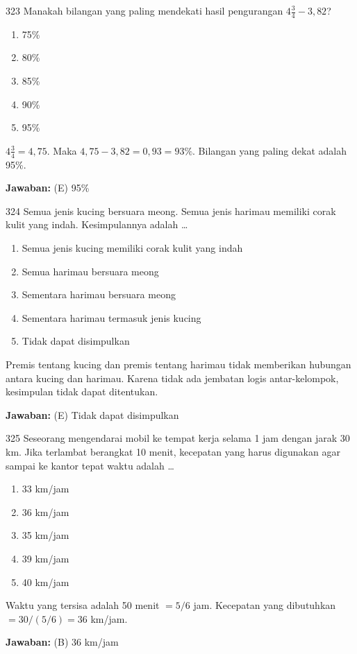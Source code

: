 \documentclass[11pt]{article}
\newenvironment{pil}{\begin{enumerate}[label=(\Alph*),leftmargin=*,itemsep=1pt,topsep=3pt]}{\end{enumerate}}
\newcommand{\jw}[1]{\par\smallskip\begin{jawbox}\textbf{Jawaban:} #1\end{jawbox}}
\begin{document}
\begin{soalbox}{3}{23}
Manakah bilangan yang paling mendekati hasil pengurangan $4\frac{3}{4}-3{,}82$?
\begin{pil}\item 75\% \item 80\% \item 85\% \item 90\% \item 95\%\end{pil}
\end{soalbox}
\begin{pembox}
$4\frac{3}{4}=4{,}75$. Maka $4{,}75-3{,}82=0{,}93=93\%$. Bilangan yang paling dekat adalah 95\%.
\jw{(E) 95\%}
\end{pembox}

\begin{soalbox}{3}{24}
Semua jenis kucing bersuara meong. Semua jenis harimau memiliki corak kulit yang indah. Kesimpulannya adalah \ldots
\begin{pil}\item Semua jenis kucing memiliki corak kulit yang indah \item Semua harimau bersuara meong \item Sementara harimau bersuara meong \item Sementara harimau termasuk jenis kucing \item Tidak dapat disimpulkan\end{pil}
\end{soalbox}
\begin{pembox}
Premis tentang kucing dan premis tentang harimau tidak memberikan hubungan antara kucing dan harimau. Karena tidak ada jembatan logis antar-kelompok, kesimpulan tidak dapat ditentukan.
\jw{(E) Tidak dapat disimpulkan}
\end{pembox}

\begin{soalbox}{3}{25}
Seseorang mengendarai mobil ke tempat kerja selama 1 jam dengan jarak 30 km. Jika terlambat berangkat 10 menit, kecepatan yang harus digunakan agar sampai ke kantor tepat waktu adalah \ldots
\begin{pil}\item 33 km/jam \item 36 km/jam \item 35 km/jam \item 39 km/jam \item 40 km/jam\end{pil}
\end{soalbox}
\begin{pembox}
Waktu yang tersisa adalah 50 menit $=5/6$ jam. Kecepatan yang dibutuhkan $=30/(5/6)=36$ km/jam.
\jw{(B) 36 km/jam}
\end{pembox}
\end{document}
